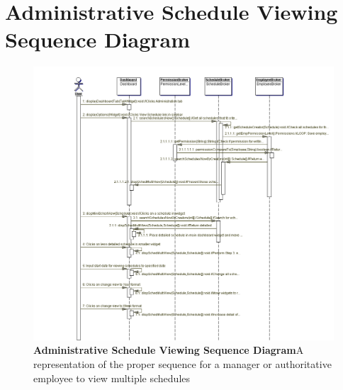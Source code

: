 \documentclass[letterpaper,12pt]{report}
\begin{document}
\section{Administrative Schedule Viewing Sequence Diagram}
\begin{figure}[hbp]
 \includegraphics[scale=0.5]{diagrams/seqManagerViewScheds.png}
 \caption{\small
\textbf{Administrative Schedule Viewing Sequence Diagram}\newline A representation of the proper sequence for a manager or authoritative employee to view multiple schedules}\label{fig:seqManagerView}
\end{figure}
\newpage
\end{document}
